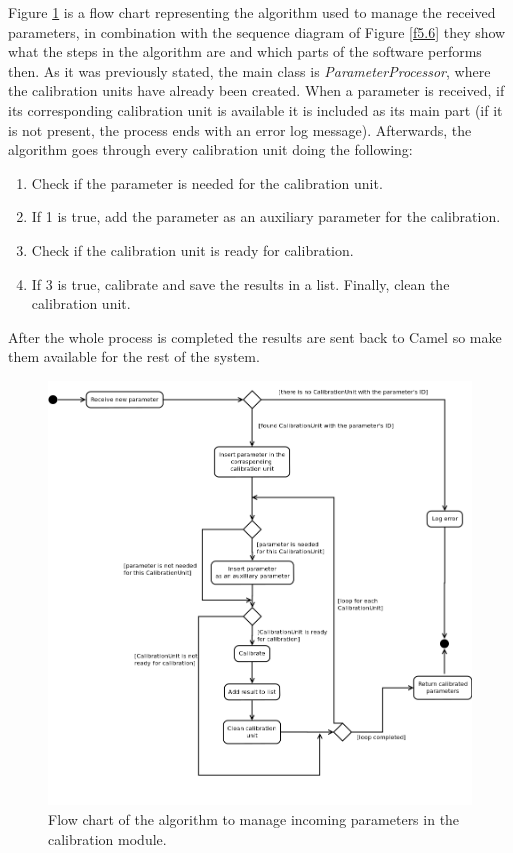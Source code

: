 Figure \ref{f5.5} is a flow chart representing the algorithm used to manage the received parameters, in combination with the sequence diagram of Figure \ref{f5.6} they show what the steps in the algorithm are and which parts of the software performs then. As it was previously stated, the main class is \emph{ParameterProcessor}, where the calibration units have already been created. When a parameter is received, if its corresponding calibration unit is available it is included as its main part (if it is not present, the process ends with an error log message). Afterwards, the algorithm goes through every calibration unit doing the following:
\begin{enumerate}
\item Check if the parameter is needed for the calibration unit.
\item If 1 is true, add the parameter as an auxiliary parameter for the calibration.
\item Check if the calibration unit is ready for calibration.
\item If 3 is true, calibrate and save the results in a list. Finally, clean the calibration unit.
\end{enumerate}

After the whole process is completed the results are sent back to Camel so make them available for the rest of the system.

\begin{figure}[H]
\centerline{\includegraphics[width=1.2\textwidth]{images/ReceiveParameterAndCalibrateFlowChart.png}}
\caption{Flow chart of the algorithm to manage incoming parameters in the calibration module.}
\label{f5.5}
\end{figure}


